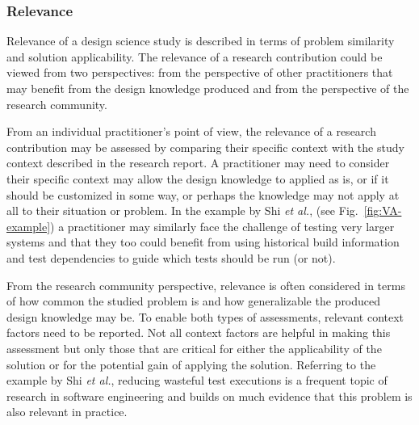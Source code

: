 \documentclass[graybox]{svmult}
\begin{document}

\subsubsection{Relevance %
} 

Relevance of a design science study is described in terms of problem similarity and solution applicability. The relevance of a research contribution could be viewed from two perspectives: from the perspective of other practitioners that may benefit from the design knowledge produced and from the perspective of the research community. 

From an individual practitioner's point of view, the relevance of a research contribution may be assessed by comparing their specific context with the study context described in the research report. 
A practitioner may need to consider their specific context may allow the design knowledge to applied as is, or if it should be customized in some way, or perhaps the knowledge may not apply at all to their situation or problem.
In the example by Shi \emph{et al.}, (see Fig.~\ref{fig:VA-example}) a practitioner may similarly face the challenge of testing very larger systems and  that they too could benefit from using historical build information and test dependencies to guide which tests should be run (or not).

From the research community perspective, relevance is often considered in terms of how common the studied problem is and how generalizable the produced design knowledge may be. To enable both types of assessments, relevant context factors need to be reported. Not all context factors are helpful in making this assessment but only those that are critical for either the applicability of the solution or for the potential gain of applying the solution. 
Referring to the example by Shi \emph{et al.}, reducing wasteful test executions is a frequent topic of research in software engineering and builds on much evidence that this problem is also relevant in practice.
\end{document}
